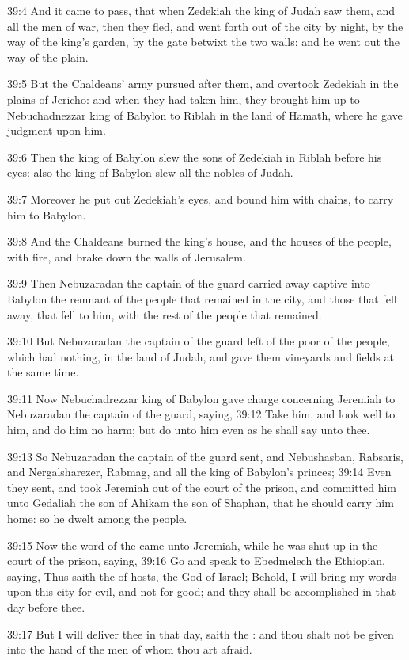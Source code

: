 39:4 And it came to pass, that when Zedekiah the king of Judah saw
them, and all the men of war, then they fled, and went forth out of
the city by night, by the way of the king's garden, by the gate
betwixt the two walls: and he went out the way of the plain.

39:5 But the Chaldeans' army pursued after them, and overtook Zedekiah
in the plains of Jericho: and when they had taken him, they brought
him up to Nebuchadnezzar king of Babylon to Riblah in the land of
Hamath, where he gave judgment upon him.

39:6 Then the king of Babylon slew the sons of Zedekiah in Riblah
before his eyes: also the king of Babylon slew all the nobles of
Judah.

39:7 Moreover he put out Zedekiah's eyes, and bound him with chains,
to carry him to Babylon.

39:8 And the Chaldeans burned the king's house, and the houses of the
people, with fire, and brake down the walls of Jerusalem.

39:9 Then Nebuzaradan the captain of the guard carried away captive
into Babylon the remnant of the people that remained in the city, and
those that fell away, that fell to him, with the rest of the people
that remained.

39:10 But Nebuzaradan the captain of the guard left of the poor of the
people, which had nothing, in the land of Judah, and gave them
vineyards and fields at the same time.

39:11 Now Nebuchadrezzar king of Babylon gave charge concerning
Jeremiah to Nebuzaradan the captain of the guard, saying, 39:12 Take
him, and look well to him, and do him no harm; but do unto him even as
he shall say unto thee.

39:13 So Nebuzaradan the captain of the guard sent, and Nebushasban,
Rabsaris, and Nergalsharezer, Rabmag, and all the king of Babylon's
princes; 39:14 Even they sent, and took Jeremiah out of the court of
the prison, and committed him unto Gedaliah the son of Ahikam the son
of Shaphan, that he should carry him home: so he dwelt among the
people.

39:15 Now the word of the \LORD came unto Jeremiah, while he was shut
up in the court of the prison, saying, 39:16 Go and speak to
Ebedmelech the Ethiopian, saying, Thus saith the \LORD of hosts, the
God of Israel; Behold, I will bring my words upon this city for evil,
and not for good; and they shall be accomplished in that day before
thee.

39:17 But I will deliver thee in that day, saith the \LORD: and thou
shalt not be given into the hand of the men of whom thou art afraid.

